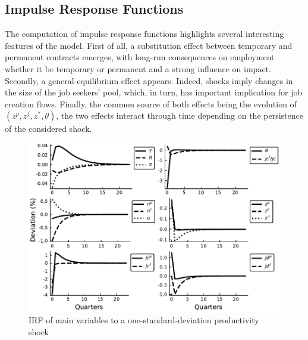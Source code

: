\documentclass[a4paper]{article}
\begin{document}

\subsection{Impulse Response Functions}

The computation of impulse response functions highlights several interesting features of the model. First of all, a substitution effect between temporary and permanent contracts emerges, with long-run consequences on employment whether it be temporary or permanent and a strong influence on impact. Secondly, a general-equilibrium effect appears. Indeed, shocks imply changes in the size of the job seekers' pool, which, in turn, has important implication for job creation flows. Finally, the common source of both effects being the evolution of $\left( z^p, z^f, z^*, \theta\right)$, the two effects interact through time depending on the persistence of the considered shock.

\begin{figure}[t]
\includegraphics[scale=1]{IRF_A.pdf}
\caption{IRF of main variables to a one-standard-deviation productivity shock}
\label{IRF_A}
\end{figure}
\end{document}

